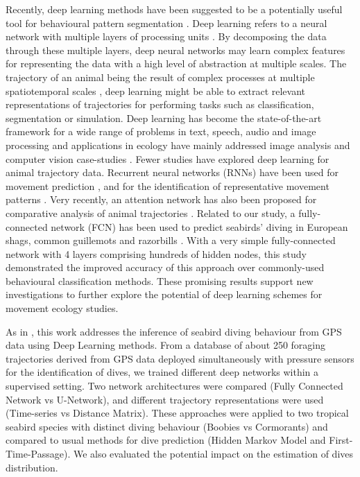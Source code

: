 \documentclass{article}
\begin{document}
Recently, deep learning methods have been suggested to be a potentially useful tool for behavioural pattern segmentation \cite{valletta_applications_2017}.
Deep learning refers to a neural network with multiple layers of processing units \cite{lecun_deep_2015}.
By decomposing the data through these multiple layers, deep neural networks may learn complex features for representing the data with a high level of abstraction at multiple scales.
The trajectory of an animal being the result of complex processes at multiple spatiotemporal scales \cite{nathan_movement_2008}, deep learning might be able to extract relevant representations of trajectories for performing tasks such as classification, segmentation or simulation.
Deep learning has become the state-of-the-art framework for a wide range of problems in text, speech, audio and image processing and applications in ecology have mainly addressed image analysis and computer vision case-studies \cite{weinstein_computer_2018, christin_applications_2019}.
Fewer studies have explored deep learning for animal trajectory data.
Recurrent neural networks (RNNs) have been used for movement prediction \cite{ardakani_encoding_2017,rew_animal_2019}, and for the identification of representative movement patterns \cite{peng_deep_2019}. Very recently, an attention network has also been proposed for comparative analysis of  animal trajectories
\cite{maekawa_deep_2020}.
Related to our study, a fully-connected network (FCN) has been used to predict seabirds' diving in European shags, common guillemots and razorbills  \cite{browning_predicting_2018}. With a very simple fully-connected network with 4 layers comprising hundreds of hidden nodes, this study demonstrated the improved accuracy of this approach over commonly-used behavioural classification methods. These promising results support new investigations to further explore the potential of deep learning schemes for movement ecology studies.

 As in \cite{browning_predicting_2018}, this work addresses the inference of seabird diving behaviour from GPS data using Deep Learning methods. From a database of about 250 foraging trajectories derived from GPS data deployed simultaneously with pressure sensors for the identification of dives, we trained different deep networks within a supervised setting. Two network architectures were compared (Fully Connected Network vs U-Network), and different trajectory representations were used (Time-series vs Distance Matrix). These approaches were applied to two tropical seabird species with distinct diving behaviour (Boobies vs Cormorants) and compared to usual methods for dive prediction (Hidden Markov Model and First-Time-Passage). We also evaluated the potential impact on the estimation of dives distribution.
\end{document}
